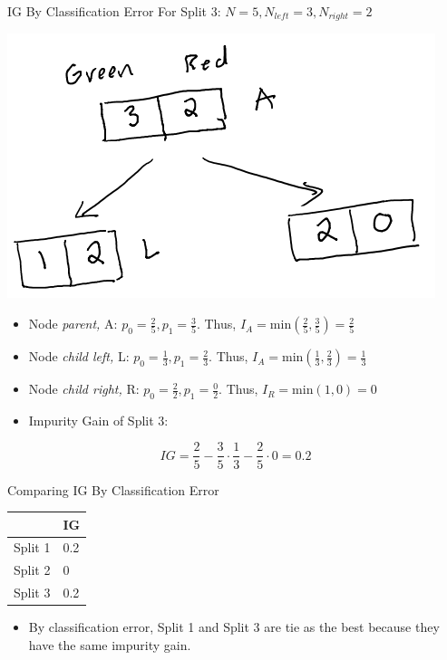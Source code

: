 \documentclass[
  ignorenonframetext,
]{beamer}
\providecommand{\tightlist}{%
  \setlength{\itemsep}{0pt}\setlength{\parskip}{0pt}}
\begin{document}
\begin{frame}{IG By Classification Error}
\protect\hypertarget{ig-by-classification-error-2}{}
For Split 3: \(N = 5, N_{left} =3, N_{right} = 2\)

\includegraphics{images/im2.png}

\begin{itemize}
\item
  Node \emph{parent,} A: \(p_0 = \frac{2}{5}, p_1 = \frac{3}{5}\). Thus,
  \(I_{A} = \text{min}(\frac{2}{5}, \frac{3}{5}) = \frac{2}{5}\)
\item
  Node \emph{child left,} L: \(p_0 = \frac{1}{3}, p_1 = \frac{2}{3}\).
  Thus, \(I_{A} = \text{min}(\frac{1}{3}, \frac{2}{3}) = \frac{1}{3}\)
\item
  Node \emph{child right,} R: \(p_0 = \frac{2}{2}, p_1 = \frac{0}{2}\).
  Thus, \(I_{R} = \text{min}(1,0) = 0\)
\item
  Impurity Gain of Split 3:
\end{itemize}

\[IG = \frac{2}{5} - \frac{3}{5} \cdot \frac{1}{3}-\frac{2}{5} \cdot 0 = 0.2\]
\end{frame}

\begin{frame}{Comparing IG By Classification Error}
\protect\hypertarget{comparing-ig-by-classification-error}{}
\begin{longtable}[]{@{}ll@{}}
\toprule
& IG \\
\midrule
\endhead
Split 1 & 0.2 \\
Split 2 & 0 \\
Split 3 & 0.2 \\
\bottomrule
\end{longtable}

\begin{itemize}
\tightlist
\item
  By classification error, Split 1 and Split 3 are tie as the best
  because they have the same impurity gain.
\end{itemize}
\end{frame}
\end{document}
